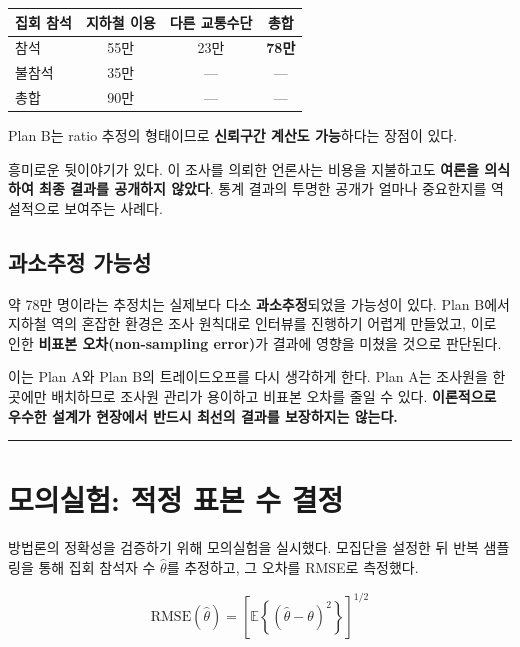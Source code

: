 \documentclass[
  letterpaper,
  DIV=11,
  numbers=noendperiod]{scrreprt}
\newcounter{none} %
\begin{document}
{\def\LTcaptype{none} %
\begin{longtable}[]{@{}lccc@{}}
\toprule\noalign{}
집회 참석 & 지하철 이용 & 다른 교통수단 & 총합 \\
\midrule\noalign{}
\endhead
\bottomrule\noalign{}
\endlastfoot
참석 & 55만 & 23만 & \textbf{78만} \\
불참석 & 35만 & --- & --- \\
총합 & 90만 & --- & --- \\
\end{longtable}
}

Plan B는 ratio 추정의 형태이므로 \textbf{신뢰구간 계산도 가능}하다는
장점이 있다.

흥미로운 뒷이야기가 있다. 이 조사를 의뢰한 언론사는 비용을 지불하고도
\textbf{여론을 의식하여 최종 결과를 공개하지 않았다}. 통계 결과의 투명한
공개가 얼마나 중요한지를 역설적으로 보여주는 사례다.

\subsection{과소추정
가능성}\label{uxacfcuxc18cuxcd94uxc815-uxac00uxb2a5uxc131}

약 78만 명이라는 추정치는 실제보다 다소 \textbf{과소추정}되었을 가능성이
있다. Plan B에서 지하철 역의 혼잡한 환경은 조사 원칙대로 인터뷰를
진행하기 어렵게 만들었고, 이로 인한 \textbf{비표본 오차(non-sampling
error)}가 결과에 영향을 미쳤을 것으로 판단된다.

이는 Plan A와 Plan B의 트레이드오프를 다시 생각하게 한다. Plan A는
조사원을 한 곳에만 배치하므로 조사원 관리가 용이하고 비표본 오차를 줄일
수 있다. \textbf{이론적으로 우수한 설계가 현장에서 반드시 최선의 결과를
보장하지는 않는다.}

\begin{center}\rule{0.5\linewidth}{0.5pt}\end{center}

\section{모의실험: 적정 표본 수
결정}\label{uxbaa8uxc758uxc2e4uxd5d8-uxc801uxc815-uxd45cuxbcf8-uxc218-uxacb0uxc815}

방법론의 정확성을 검증하기 위해 모의실험을 실시했다. 모집단을 설정한 뒤
반복 샘플링을 통해 집회 참석자 수 \(\hat{\theta}\)를 추정하고, 그 오차를
RMSE로 측정했다.

\[\text{RMSE}(\hat{\theta}) = \left[\mathbb{E}\left\{(\hat{\theta} - \theta)^2\right\}\right]^{1/2}\]
\end{document}

